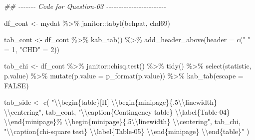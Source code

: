 \documentclass[
  12pt,
  oneside]{article}
\newenvironment{Shaded}{}{}
\newcommand{\AttributeTok}[1]{\textcolor[rgb]{0.49,0.56,0.16}{#1}}
\newcommand{\ConstantTok}[1]{\textcolor[rgb]{0.53,0.00,0.00}{#1}}
\newcommand{\DecValTok}[1]{\textcolor[rgb]{0.25,0.63,0.44}{#1}}
\newcommand{\DocumentationTok}[1]{\textcolor[rgb]{0.73,0.13,0.13}{\textit{#1}}}
\newcommand{\FunctionTok}[1]{\textcolor[rgb]{0.02,0.16,0.49}{#1}}
\newcommand{\NormalTok}[1]{#1}
\newcommand{\OtherTok}[1]{\textcolor[rgb]{0.00,0.44,0.13}{#1}}
\newcommand{\SpecialCharTok}[1]{\textcolor[rgb]{0.25,0.44,0.63}{#1}}
\newcommand{\StringTok}[1]{\textcolor[rgb]{0.25,0.44,0.63}{#1}}
\begin{document}
\begin{Shaded}
\begin{Highlighting}[]
\DocumentationTok{\#\# {-}{-}{-}{-}{-}{-}{-} Code for Question{-}03 {-}{-}{-}{-}{-}{-}{-}{-}{-}{-}{-}{-}{-}{-}{-}{-}{-}{-}{-}{-}{-}{-}{-}{-}}

\NormalTok{df\_cont }\OtherTok{\textless{}{-}}\NormalTok{ mydat }\SpecialCharTok{\%\textgreater{}\%}\NormalTok{ janitor}\SpecialCharTok{::}\FunctionTok{tabyl}\NormalTok{(behpat, chd69)}

\NormalTok{tab\_cont }\OtherTok{\textless{}{-}}\NormalTok{ df\_cont }\SpecialCharTok{\%\textgreater{}\%}
  \FunctionTok{kab\_tab}\NormalTok{() }\SpecialCharTok{\%\textgreater{}\%}
  \FunctionTok{add\_header\_above}\NormalTok{(}\AttributeTok{header =} \FunctionTok{c}\NormalTok{(}\StringTok{" "} \OtherTok{=} \DecValTok{1}\NormalTok{, }\StringTok{"CHD"} \OtherTok{=} \DecValTok{2}\NormalTok{))}

\NormalTok{tab\_chi }\OtherTok{\textless{}{-}}\NormalTok{ df\_cont }\SpecialCharTok{\%\textgreater{}\%}
\NormalTok{  janitor}\SpecialCharTok{::}\FunctionTok{chisq.test}\NormalTok{() }\SpecialCharTok{\%\textgreater{}\%}
  \FunctionTok{tidy}\NormalTok{() }\SpecialCharTok{\%\textgreater{}\%}
  \FunctionTok{select}\NormalTok{(statistic, p.value) }\SpecialCharTok{\%\textgreater{}\%}
  \FunctionTok{mutate}\NormalTok{(}\AttributeTok{p.value =} \FunctionTok{p\_format}\NormalTok{(p.value)) }\SpecialCharTok{\%\textgreater{}\%}
  \FunctionTok{kab\_tab}\NormalTok{(}\AttributeTok{escape =} \ConstantTok{FALSE}\NormalTok{)}

\NormalTok{tab\_side }\OtherTok{\textless{}{-}} \FunctionTok{c}\NormalTok{(}
    \StringTok{"}\SpecialCharTok{\textbackslash{}\textbackslash{}}\StringTok{begin\{table\}[H]}
\StringTok{      }\SpecialCharTok{\textbackslash{}\textbackslash{}}\StringTok{begin\{minipage\}\{.5}\SpecialCharTok{\textbackslash{}\textbackslash{}}\StringTok{linewidth\}}
\StringTok{      }\SpecialCharTok{\textbackslash{}\textbackslash{}}\StringTok{centering"}\NormalTok{,}
\NormalTok{      tab\_cont,}
      \StringTok{"}\SpecialCharTok{\textbackslash{}\textbackslash{}}\StringTok{caption\{Contingency table\}}
\StringTok{      }\SpecialCharTok{\textbackslash{}\textbackslash{}}\StringTok{label\{Table{-}04\}}
\StringTok{    }\SpecialCharTok{\textbackslash{}\textbackslash{}}\StringTok{end\{minipage\}\%}
\StringTok{      }\SpecialCharTok{\textbackslash{}\textbackslash{}}\StringTok{begin\{minipage\}\{.5}\SpecialCharTok{\textbackslash{}\textbackslash{}}\StringTok{linewidth\}}
\StringTok{        }\SpecialCharTok{\textbackslash{}\textbackslash{}}\StringTok{centering"}\NormalTok{,}
\NormalTok{    tab\_chi,}
    \StringTok{"}\SpecialCharTok{\textbackslash{}\textbackslash{}}\StringTok{caption\{chi{-}square test\}}
\StringTok{    }\SpecialCharTok{\textbackslash{}\textbackslash{}}\StringTok{label\{Table{-}05\}}
\StringTok{    }\SpecialCharTok{\textbackslash{}\textbackslash{}}\StringTok{end\{minipage\}}
\StringTok{      }\SpecialCharTok{\textbackslash{}\textbackslash{}}\StringTok{end\{table\}"}
\NormalTok{  )}


\end{Highlighting}
\end{Shaded}
\end{document}

